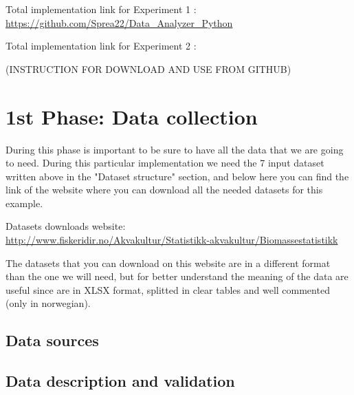 

\hypersetup{
    colorlinks=true,
    linkcolor=blue,
    filecolor=magenta,      
    urlcolor=blue,
}


Total implementation link for Experiment 1 : \\
\url{https://github.com/Sprea22/Data_Analyzer_Python}

Total implementation link for Experiment 2 : \\
\url{}

(INSTRUCTION FOR DOWNLOAD AND USE FROM GITHUB)

\newpage
\section{1st Phase: Data collection}
During this phase is important to be sure to have all the data that we are going to need. During this particular implementation we need the 7 input dataset written above in the "Dataset structure" section, and below here you can find the link of the website where you can download all the needed datasets for this example.

Datasets downloads website:\\ 
\url{http://www.fiskeridir.no/Akvakultur/Statistikk-akvakultur/Biomassestatistikk}

The datasets that you can download on this website are in a different format than the one we will need, but for better understand the meaning of the data are useful since are in XLSX format, splitted in clear tables and well commented (only in norwegian).

\subsection{Data sources}
\subsection{Data description and validation}

